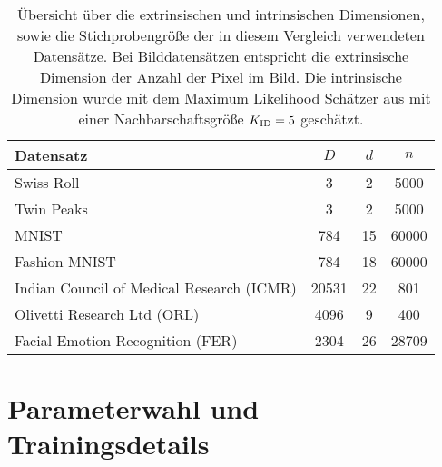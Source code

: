 \begin{table}[]
	\centering
	\begin{tabular}{@{}lS[table-format=5.0]S[table-format=2.0]S[table-format=5.0]@{}}
		\toprule
		Datensatz                                 & {$D$} & {$d$} & {$n$} \\ \midrule
		Swiss Roll                                & 3     & 2     & 5000  \\
		Twin Peaks                                & 3     & 2     & 5000  \\
		MNIST                                     & 784   & 15    & 60000 \\
		Fashion MNIST                             & 784   & 18    & 60000 \\
		Indian Council of Medical Research (ICMR) & 20531 & 22    & 801   \\
		Olivetti Research Ltd (ORL)               & 4096  & 9     & 400   \\
		Facial Emotion Recognition (FER)          & 2304  & 26    & 28709 \\
		\bottomrule
	\end{tabular}
	\caption[Übersicht über die extrinsischen und intrinsischen Dimensionen, sowie die Stichprobengrößen der in diesem Vergleich verwendeten Datensätze]{Übersicht über die extrinsischen und intrinsischen Dimensionen, sowie die Stichprobengröße der in diesem Vergleich verwendeten Datensätze. Bei Bilddatensätzen entspricht die extrinsische Dimension der Anzahl der Pixel im Bild. Die intrinsische Dimension wurde mit dem Maximum Likelihood Schätzer aus  mit einer Nachbarschaftsgröße $K_{\text{ID}} = 5$ geschätzt.}
	\label{tab:uebersicht-datensaetze}
\end{table}

\section{Parameterwahl und Trainingsdetails}
\label{ch:Vergleich:sec:ParameterwahlTrainingsdetails}


